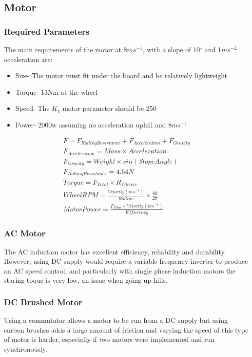 \documentclass[journal,10pt]{IEEEtran}
\begin{document}
    \subsection{Motor}
        \subsubsection{Required Parameters}
        The main requirements of the motor at 8$ms^{-1}$, with a slope of 10$^{\circ}$ and 1$ms^{-2}$ acceleration are:
        \begin{itemize}
        	\item Size- The motor must fit under the board and be relatively lightweight
        	\item Torque- 13Nm at the wheel 
        	\item Speed- The $K_{v}$ motor parameter should be 250
        	\item Power- 2000w assuming no acceleration uphill and 8$ms^{-1}$
        \end{itemize}
        \begin{gather*}
            F = F_{Rolling Resistance} + F_{Acceleration} + F_{Gravity}\\
            F_{Acceleration} = Mass \times Acceleration\\
            F_{Gravity} = Weight \times sin(Slope Angle)\\
            F_{Rolling Resistance} = 4.64N\\
            Torque = F_{Total} \times R_{Wheels}\\
            Wheel RPM = \frac{Velocity (ms^{-1})}{Radius}\times \frac{60}{2\pi}\\
            Motor Power = \frac{F_{Total} \times Velocity (ms^{-1})}{Efficiency}
        \end{gather*}
        \subsubsection{AC Motor}
            The AC induction motor has excellent efficiency, reliability and durability. However, using DC supply would require a variable frequency inverter to produce an AC speed control, and particularly with single phase induction motors the staring toque is very low, an issue when going up hills. 
        \subsubsection{DC Brushed Motor}
            Using a commutator allows a motor to be run from a DC supply but using carbon brushes adds a large amount of friction and varying the speed of this type of motor is harder, especially if two motors were implemented and run synchronously.
\end{document}

